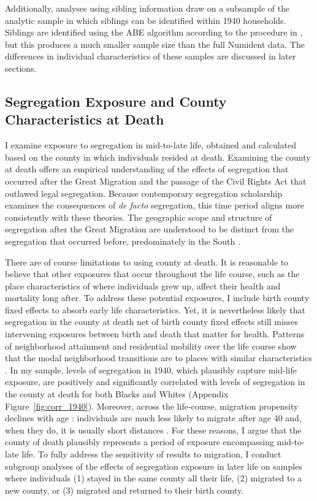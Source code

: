 \documentclass[11pt]{article}
\begin{document}
Additionally, analyses using sibling information draw on a subsample of the analytic sample in which siblings can be identified within 1940 households. Siblings are identified using the ABE algorithm according to the procedure in \citet{breen_longevity_2024}, but this produces a much smaller sample size than the full Numident data. The differences in individual characteristics of these samples are discussed in later sections. 

\subsection{Segregation Exposure and County Characteristics at Death}

I examine exposure to segregation in mid-to-late life, obtained and calculated based on the county in which individuals resided at death. Examining the county at death offers an empirical understanding of the effects of segregation that occurred after the Great Migration and the passage of the Civil Rights Act that outlawed legal segregation.
Because contemporary segregation scholarship examines the consequences of \textit{de facto} segregation, this time period aligns more consistently with these theories. The geographic scope and structure of segregation after the Great Migration are understood to be distinct from the segregation that occurred before, predominately in the South \citep{leibbrand_great_2020,grigoryeva_historical_2015}.

There are of course limitations to using county at death. It is reasonable to believe that other exposures that occur throughout the life course, such as the place characteristics of where individuals grew up, affect their health and mortality long after. To address these potential exposures, I include birth county fixed effects to absorb early life characteristics. Yet, it is nevertheless likely that segregation in the county at death net of birth county fixed effects still misses intervening exposures between birth and death that matter for health. Patterns of neighborhood attainment and residential mobility over the life course show that the modal neighborhood transitions are to places with similar characteristics \citep{sampson_neighborhood_2008}. In my sample, levels of segregation in 1940, which plausibly capture mid-life exposure, are positively and significantly correlated with levels of segregation in the county at death for both Blacks and Whites (Appendix Figure~\ref{fig:corr_1940}). Moreover, across the life-course, migration propensity declines with age \citep{bernard_life-course_2014}: individuals are much less likely to migrate after age 40 and, when they do, it is usually short distances \citep{molloy_internal_2011,zimran_internal_2022}. For these reasons, I argue that the county of death plausibly represents a period of exposure encompassing mid-to-late life. To fully address the sensitivity of results to migration, I conduct subgroup analyses of the effects of segregation exposure in later life on samples where individuals (1) stayed in the same county all their life, (2) migrated to a new county, or (3) migrated and returned to their birth county.
\end{document}
